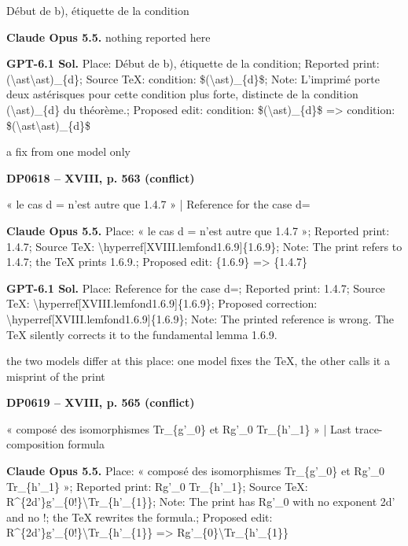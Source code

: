 Début de b), étiquette de la condition\par
\textbf{Claude Opus 5.5.} nothing reported here\par
\textbf{GPT-6.1 Sol.} Place: Début de b), étiquette de la condition; Reported print: (\textbackslash{}ast\textbackslash{}ast)\_\{d\}; Source TeX: condition: \$(\textbackslash{}ast)\_\{d\}\$; Note: L'imprimé porte deux astérisques pour cette condition plus forte, distincte de la condition (\textbackslash{}ast)\_\{d\} du théorème.; Proposed edit: condition: \$(\textbackslash{}ast)\_\{d\}\$ =\allowbreak > condition: \$(\textbackslash{}ast\textbackslash{}ast)\_\{d\}\$\par
a fix from one model only\par
\par\noindent\hypertarget{DP0618}{}\textbf{DP0618 -- XVIII, p. 563 (conflict)}\par
« le cas d = n'est autre que 1.4.7 » | Reference for the case d=\par
\textbf{Claude Opus 5.5.} Place: « le cas d = n'est autre que 1.4.7 »; Reported print: 1.4.7; Source TeX: \textbackslash{}hyperref[XVIII.lemfond1.6.9]\{1.6.9\}; Note: The print refers to 1.4.7; the TeX prints 1.6.9.; Proposed edit: \{1.6.9\} =\allowbreak > \{1.4.7\}\par
\textbf{GPT-6.1 Sol.} Place: Reference for the case d=; Reported print: 1.4.7; Source TeX: \textbackslash{}hyperref[XVIII.lemfond1.6.9]\{1.6.9\}; Proposed correction: \textbackslash{}hyperref[XVIII.lemfond1.6.9]\{1.6.9\}; Note: The printed reference is wrong. The TeX silently corrects it to the fundamental lemma 1.6.9.\par
the two models differ at this place: one model fixes the TeX, the other calls it a misprint of the print\par
\par\noindent\hypertarget{DP0619}{}\textbf{DP0619 -- XVIII, p. 565 (conflict)}\par
« composé des isomorphismes Tr\_\{g'\_0\} et Rg'\_0 Tr\_\{h'\_1\} » | Last trace-composition formula\par
\textbf{Claude Opus 5.5.} Place: « composé des isomorphismes Tr\_\{g'\_0\} et Rg'\_0 Tr\_\{h'\_1\} »; Reported print: Rg'\_0 Tr\_\{h'\_1\}; Source TeX: R\textasciicircum{}\{2d'\}g'\_\{0!\}\textbackslash{}Tr\_\{h'\_\{1\}\}; Note: The print has Rg'\_0 with no exponent 2d' and no !; the TeX rewrites the formula.; Proposed edit: R\textasciicircum{}\{2d'\}g'\_\{0!\}\textbackslash{}Tr\_\{h'\_\{1\}\} =\allowbreak > Rg'\_\{0\}\textbackslash{}Tr\_\{h'\_\{1\}\}\par
